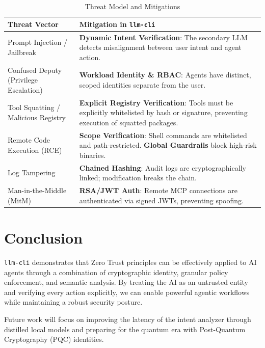 \documentclass[conference]{IEEEtran}
\begin{document}
\begin{table}[htbp]
\caption{Threat Model and Mitigations}
\begin{center}
\begin{tabular}{|>{\raggedright\arraybackslash}p{3cm}|>{\raggedright\arraybackslash}p{4.5cm}|}
\hline
\textbf{Threat Vector} & \textbf{Mitigation in \texttt{llm-cli}} \\
\hline
Prompt Injection / Jailbreak \cite{zhang2025} & \textbf{Dynamic Intent Verification}: The secondary LLM detects misalignment between user intent and agent action. \\
\hline
Confused Deputy (Privilege Escalation) & \textbf{Workload Identity \& RBAC}: Agents have distinct, scoped identities separate from the user. \\
\hline
Tool Squatting / Malicious Registry \cite{huang2025} & \textbf{Explicit Registry Verification}: Tools must be explicitly whitelisted by hash or signature, preventing execution of squatted packages. \\
\hline
Remote Code Execution (RCE) & \textbf{Scope Verification}: Shell commands are whitelisted and path-restricted. \textbf{Global Guardrails} block high-risk binaries. \\
\hline
Log Tampering & \textbf{Chained Hashing}: Audit logs are cryptographically linked; modification breaks the chain. \\
\hline
Man-in-the-Middle (MitM) & \textbf{RSA/JWT Auth}: Remote MCP connections are authenticated via signed JWTs, preventing spoofing. \\
\hline
\end{tabular}
\label{tab:threats}
\end{center}
\end{table}

\section{Conclusion}
\texttt{llm-cli} demonstrates that Zero Trust principles can be effectively applied to AI agents through a combination of cryptographic identity, granular policy enforcement, and semantic analysis. By treating the AI as an untrusted entity and verifying every action explicitly, we can enable powerful agentic workflows while maintaining a robust security posture.

Future work will focus on improving the latency of the intent analyzer through distilled local models and preparing for the quantum era with Post-Quantum Cryptography (PQC) identities.
\end{document}
